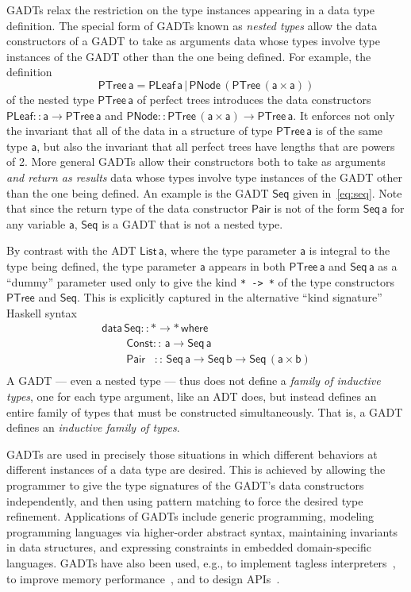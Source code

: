 \documentclass[acmsmall,screen,review,anonymous]{acmart}
\theoremstyle{definition}
\begin{document}
GADTs relax the restriction on the type instances appearing in a data
type definition. The special form of GADTs known as {\em nested types}
allow the data constructors of a GADT to take as arguments data whose
types involve type instances of the GADT other than the one being
defined. For example, the definition
\[\mathsf{PTree \, a = PLeaf \,a \,|\, PNode \,(PTree\,(a \times
  a))}\] of the nested type $\mathsf{PTree\,a}$ of perfect trees
introduces the data constructors $\mathsf{PLeaf :: a \to PTree\,a}$
and $\mathsf{PNode :: PTree \,(a\times a) \to PTree\,a}$. It enforces
not only the invariant that all of the data in a structure of type
$\mathsf{PTree\,a}$ is of the same type $\mathsf{a}$, but also the
invariant that all perfect trees have lengths that are powers of
2. More general GADTs allow their constructors both to take as
arguments {\em and return as results} data whose types involve type
instances of the GADT other than the one being defined. An example is
the GADT $\mathsf{Seq}$ given in~\eqref{eq:seq}. Note that since the
return type of the data constructor $\mathsf{Pair}$ is not of the form
$\mathsf{Seq\,a}$ for any variable $\mathsf{a}$, $\mathsf{Seq}$ is a
GADT that is not a nested type.

By contrast with the ADT $\mathsf{List\, a}$, where the type parameter
$\mathsf{a}$ is integral to the type being defined, the type parameter
$\mathsf{a}$ appears in both $\mathsf{PTree\,a}$ and $\mathsf{Seq\,a}$
as a ``dummy'' parameter used only to give the kind \verb|* -> *| of
the type constructors $\mathsf{PTree}$ and $\mathsf{Seq}$. This is
explicitly captured in the alternative ``kind signature'' Haskell
syntax
\[\begin{array}{l}
\mathsf{data\, Seq :: * \to *\,where}\\
\mathsf{\;\;\;\;\;\;\;\;Const ::\, a \to Seq\,a}\\
\mathsf{\;\;\;\;\;\;\;\;Pair\,\,\,\,\, ::\, Seq \,a \to Seq\,b \to
  Seq\,(a \times b)}\\ 
\end{array}\]
A GADT --- even a nested type --- thus does not define a {\em family
  of inductive types}, one for each type argument, like an ADT does,
but instead defines an entire family of types that must be constructed
simultaneously. That is, a GADT defines an {\em inductive family of
  types}.

GADTs are used in precisely those situations in which different
behaviors at different instances of a data type are desired. This is
achieved by allowing the programmer to give the type signatures of the
GADT's data constructors independently, and then using pattern
matching to force the desired type refinement. Applications of GADTs
include generic programming, modeling programming languages via
higher-order abstract syntax, maintaining invariants in data
structures, and expressing constraints in embedded domain-specific
languages. GADTs have also been used, e.g., to implement tagless
interpreters~\cite{pl04,pr06,pvww06}, to improve memory
performance~\cite{min15}, and to design APIs~\cite{pen20}.
\end{document}

